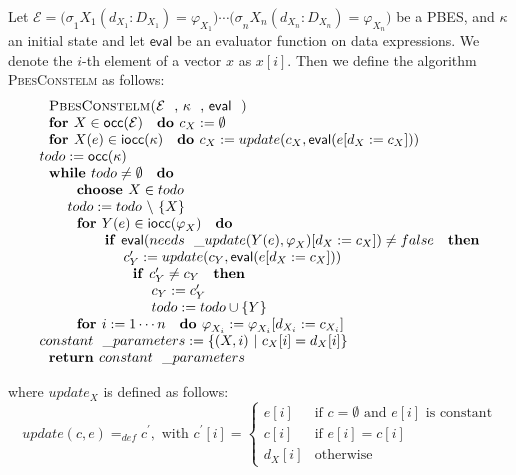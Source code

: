 \documentclass{article}
\begin{document}
Let $\mathcal{E=(\sigma }_{1}X_{1}(d_{X_{1}}:D_{X_{1}})=\varphi
_{X_{1}})\cdots \mathcal{(\sigma }_{n}X_{n}(d_{X_{n}}:D_{X_{n}})=\varphi
_{X_{n}})$ be a PBES, and $\kappa $ an initial state and let $\mathsf{eval}$
be an evaluator function on data expressions. We denote the $i$-th element
of a vector $x$ as $x[i]$. Then we define the algorithm \textsc{PbesConstelm}
as follows:$\qquad \qquad $%
\begin{equation*}
\begin{array}{l}
\text{\textsc{PbesConstelm(}}\mathcal{E}\text{, }\kappa \text{, }\mathsf{eval%
}\text{\textsc{)}} \\ 
\text{\textbf{for }}X\in \mathsf{occ}(\mathcal{E)}\text{ \textbf{do }}%
c_{X}:=\emptyset \\ 
\text{\textbf{for }}X(e)\in \mathsf{iocc}(\kappa \mathcal{)}\text{ \textbf{%
do }}c_{X}:=update(c_{X},\mathsf{eval}(e[d_{X}:=c_{X}])) \\ 
todo:=\mathsf{occ}(\kappa \mathcal{)} \\ 
\text{\textbf{while }}todo\neq \emptyset \text{ \textbf{do}} \\ 
\qquad \text{\textbf{choose }}X\in todo \\ 
\qquad todo:=todo\ \backslash \ \{X\} \\ 
\qquad \text{\textbf{for }}Y(e)\in \mathsf{iocc}(\varphi _{X}\mathcal{)}%
\text{ \textbf{do}} \\ 
\qquad \qquad \text{\textbf{if }}\mathsf{eval}(needs\_update(Y(e),\varphi
_{X})[d_{X}:=c_{X}])\neq false\text{ \textbf{then}} \\ 
\qquad \qquad \qquad c_{Y}^{\prime }:=update(c_{Y},\mathsf{eval}%
(e[d_{X}:=c_{X}])) \\ 
\qquad \qquad \qquad \text{\textbf{if }}c_{Y}^{\prime }\neq c_{Y}\text{ 
\textbf{then}} \\ 
\qquad \qquad \qquad \qquad c_{Y}:=c_{Y}^{\prime } \\ 
\qquad \qquad \qquad \qquad todo:=todo\cup \{Y\} \\ 
\qquad \text{\textbf{for }}i:=1\cdots n\text{ \textbf{do }}\varphi
_{X_{i}}:=\varphi _{X_{i}}[d_{X_{i}}:=c_{X_{i}}] \\ 
constant\_parameters:=\{(X,i)\ |\ c_{X}[i]=d_{X}[i]\} \\ 
\text{\textbf{return }}constant\_parameters%
\end{array}%
\end{equation*}

where $update_{X}$ is defined as follows:%
\begin{equation*}
update(c,e)=_{def}c^{\prime },\text{ with }c^{\prime }[i]=\left\{ 
\begin{array}{ll}
e[i] & \text{if }c=\emptyset \text{ and }e[i]\text{ is constant} \\ 
c[i] & \text{if }e[i]=c[i] \\ 
d_{X}[i] & \text{otherwise}%
\end{array}%
\right.
\end{equation*}
\end{document}
